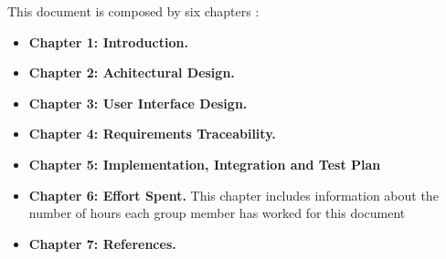 This document is composed by six chapters :
\begin{itemize}
    \item \textbf{Chapter 1: Introduction.} 
    \item \textbf{Chapter 2: Achitectural Design.} 
    \item \textbf{Chapter 3: User Interface Design.} 
    \item \textbf{Chapter 4: Requirements Traceability.} 
    \item \textbf{Chapter 5: Implementation, Integration and Test Plan} 
    \item \textbf{Chapter 6: Effort Spent.}  This chapter includes information about the number of hours each group member has worked for this document
    \item \textbf{Chapter 7: References.}
\end{itemize}